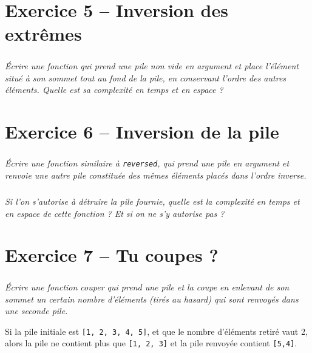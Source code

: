 
\section*{Exercice 5 -- Inversion des extrêmes}

\setcounter{exo}{0}
\subparagraph*{}
\textit{Écrire une fonction qui prend une pile non vide en argument et place l’élément situé à
son sommet tout au fond de la pile, en conservant l’ordre des autres éléments.
Quelle est sa complexité en temps et en espace ?}
\ifprof
\begin{corrige}
\end{corrige}
\else
\fi

\section*{Exercice 6 -- Inversion de la pile}
\setcounter{exo}{0}
\subparagraph{}
\textit{Écrire une fonction similaire à \texttt{reversed}, qui prend une pile en argument et renvoie une autre pile constituée des mêmes éléments placés dans l’ordre inverse.}

\subparagraph{}
\textit{ Si l’on s’autorise à détruire la pile fournie, quelle est la complexité en temps et en espace de cette fonction ? Et si on ne s’y autorise pas ?}
\ifprof
\begin{corrige}
\end{corrige}
\else
\fi

\section*{Exercice 7 -- Tu coupes ?}
\setcounter{exo}{0}
\subparagraph*{}
\textit{Écrire une fonction couper qui prend une pile et la coupe en enlevant de son sommet un
certain nombre d’éléments (tirés au hasard) qui sont renvoyés dans une seconde pile.}

\begin{exemple}
Si la pile initiale est \texttt{[1, 2, 3, 4, 5]}, et que le nombre d’éléments retiré vaut 2, alors la pile ne contient plus que \texttt{[1, 2, 3]} et la pile renvoyée contient \texttt{[5,4]}.
\end{exemple}
\ifprof
\begin{corrige}
\end{corrige}
\else
\fi

